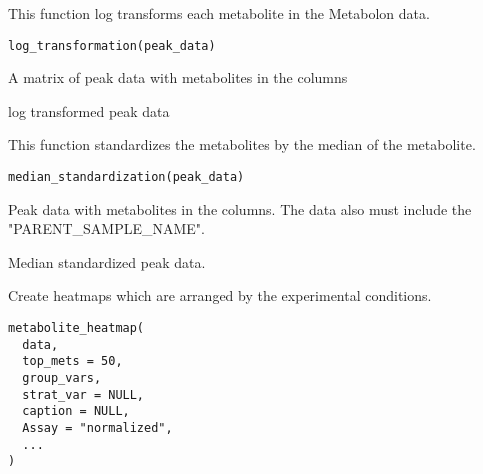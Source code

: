 \documentclass[a4paper]{book}
\begin{document}
%
\begin{Description}
This function log transforms each metabolite in the Metabolon data.
\end{Description}
%
\begin{Usage}
\begin{verbatim}
log_transformation(peak_data)
\end{verbatim}
\end{Usage}
%
\begin{Arguments}
\begin{ldescription}
\item[\code{peak\_data}] A matrix of peak data with metabolites in the columns
\end{ldescription}
\end{Arguments}
%
\begin{Value}
log transformed peak data
\end{Value}
%
\begin{Description}
This function standardizes the metabolites by the median of the metabolite.
\end{Description}
%
\begin{Usage}
\begin{verbatim}
median_standardization(peak_data)
\end{verbatim}
\end{Usage}
%
\begin{Arguments}
\begin{ldescription}
\item[\code{peak\_data}] Peak data with metabolites in the columns. The data also
must include the "PARENT\_SAMPLE\_NAME".
\end{ldescription}
\end{Arguments}
%
\begin{Value}
Median standardized peak data.
\end{Value}
%
\begin{Description}
Create heatmaps which are arranged by the experimental conditions.
\end{Description}
%
\begin{Usage}
\begin{verbatim}
metabolite_heatmap(
  data,
  top_mets = 50,
  group_vars,
  strat_var = NULL,
  caption = NULL,
  Assay = "normalized",
  ...
)
\end{verbatim}
\end{Usage}
\end{document}
